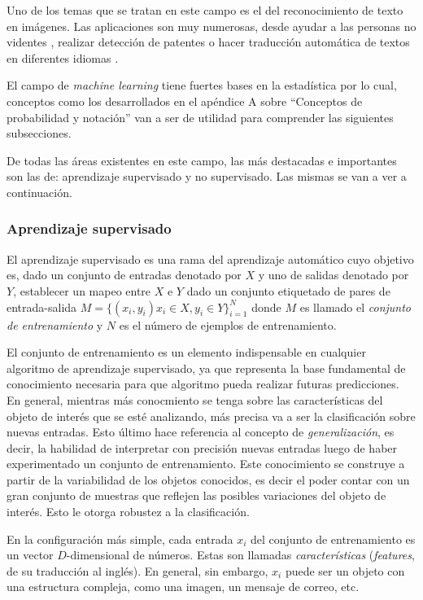 	Uno de los temas que se tratan en este campo es el del reconocimiento de texto en imágenes. Las aplicaciones son muy numerosas, desde ayudar a las personas no videntes \cite{Optelec}, realizar detección de patentes \cite{DAB} o hacer traducción automática de textos en diferentes idiomas \cite{WordLens}.
	 
	 El campo de \textit{machine learning} tiene fuertes bases en la estadística por lo cual, conceptos como los desarrollados en el apéndice A sobre ``Conceptos de probabilidad y notación'' van a ser de utilidad para comprender las siguientes subsecciones.
	 
	 De todas las áreas existentes en este campo, las más destacadas e importantes son las de: aprendizaje supervisado y no supervisado. Las mismas se van a ver a continuación.
	 	
	\subsubsection{Aprendizaje supervisado}
	
	El aprendizaje supervisado es una rama del aprendizaje automático cuyo objetivo es, dado un conjunto de entradas denotado por $X$ y uno de salidas denotado por $Y$, establecer un mapeo entre $X$ e $Y$ dado un conjunto etiquetado de pares de entrada-salida $M=\{(x_i,y_i) x_i \in X, y_i \in Y \}^{N}_{i=1}$ donde $M$ es llamado el \textit{conjunto de entrenamiento} y $N$ es el número de ejemplos de entrenamiento.
	
	El conjunto de entrenamiento es un elemento indispensable en cualquier algoritmo de aprendizaje supervisado, ya que representa la base fundamental de conocimiento necesaria para que algoritmo pueda realizar futuras predicciones. En general, mientras más conocmiento se tenga sobre las características del objeto de interés que se esté analizando, más precisa va a ser la clasificación sobre nuevas entradas. Esto último hace referencia al concepto de \textit{generalización}, es decir, la habilidad de interpretar con precisión nuevas entradas luego de haber experimentado un conjunto de entrenamiento. Este conocimiento se construye a partir de la variabilidad de los objetos conocidos, es decir el poder contar con un gran conjunto de muestras que reflejen las posibles variaciones del objeto de interés. Esto le otorga robustez a la clasificación. 
	
	En la configuración más simple, cada entrada $x_i$ del conjunto de entrenamiento es un vector $D$-dimensional de números. Estas son llamadas \textit{características} (\textit{features}, de su traducción al inglés). En general, sin embargo, $x_i$ puede ser un objeto con una estructura compleja, como una imagen, un mensaje de correo, etc.
	
